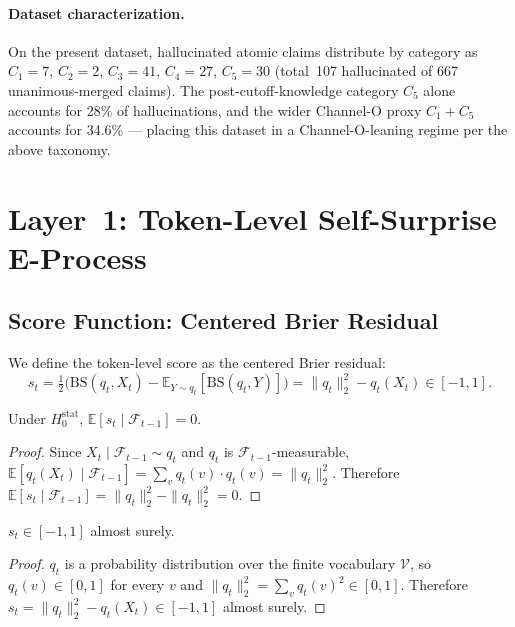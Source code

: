 \documentclass[runningheads]{llncs}
\newcommand{\Hnull}{H_0^{\text{stat}}}
\begin{document}
\paragraph{Dataset characterization.}
On the present dataset, hallucinated atomic claims distribute by category
as $C_1{=}7$, $C_2{=}2$, $C_3{=}41$, $C_4{=}27$, $C_5{=}30$ (total~107
hallucinated of 667 unanimous-merged claims). The post-cutoff-knowledge
category $C_5$ alone accounts for 28\% of hallucinations, and the wider
Channel-O proxy $C_1 + C_5$ accounts for 34.6\% — placing this dataset
in a Channel-O-leaning regime per the above taxonomy.

\section{Layer~1: Token-Level Self-Surprise E-Process}

\subsection{Score Function: Centered Brier Residual}

We define the token-level score as the centered Brier residual:
\begin{equation}\label{eq:st}
s_t = \tfrac{1}{2}\bigl(\text{BS}(q_t, X_t) -
      \mathbb{E}_{Y \sim q_t}[\text{BS}(q_t, Y)]\bigr)
    = \|q_t\|_2^2 - q_t(X_t) \in [-1, 1].
\end{equation}

\begin{lemma}[Mean-zero under $\Hnull$]\label{lem:mean-zero}
Under $\Hnull$, $\mathbb{E}[s_t \mid \mathcal{F}_{t-1}] = 0$.
\end{lemma}

\begin{proof}
Since $X_t \mid \mathcal{F}_{t-1} \sim q_t$ and $q_t$ is
$\mathcal{F}_{t-1}$-measurable,
$\mathbb{E}[q_t(X_t) \mid \mathcal{F}_{t-1}]
 = \sum_v q_t(v) \cdot q_t(v) = \|q_t\|_2^2$.
Therefore $\mathbb{E}[s_t \mid \mathcal{F}_{t-1}]
 = \|q_t\|_2^2 - \|q_t\|_2^2 = 0$.
\end{proof}

\begin{lemma}[Boundedness]\label{lem:bounded}
$s_t \in [-1, 1]$ almost surely.
\end{lemma}

\begin{proof}
$q_t$ is a probability distribution over the finite vocabulary
$\mathcal{V}$, so $q_t(v) \in [0, 1]$ for every $v$ and
$\|q_t\|_2^2 = \sum_v q_t(v)^2 \in [0, 1]$. Therefore
$s_t = \|q_t\|_2^2 - q_t(X_t) \in [-1, 1]$ almost surely.
\end{proof}
\end{document}
